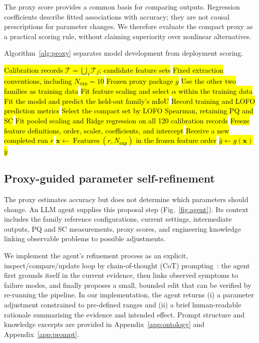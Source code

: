 \documentclass[a4paper,fleqn]{cas-dc}
\begin{document}
{The proxy score provides a common basis for comparing outputs. Regression coefficients describe fitted associations with accuracy; they are not causal prescriptions for parameter changes. We therefore evaluate the compact proxy as a practical scoring rule, without claiming superiority over nonlinear alternatives.

Algorithm~\ref{alg:proxy} separates model development from deployment scoring.

\begin{algorithm}[ht]
\caption{\hl{Proxy calibration and deployment scoring}}
\label{alg:proxy}
\begin{algorithmic}[1]
\Require \hl{Calibration records $\mathcal{T}=\bigcup_f\mathcal{T}_f$; candidate feature sets}
\Require \hl{Fixed extraction conventions, including $N_{\mathrm{exp}}=10$}
\Ensure \hl{Frozen proxy package $g$}
        \State \hl{Use the other two families as training data}
        \State \hl{Fit feature scaling and select $\alpha$ within the training data}
        \State \hl{Fit the model and predict the held-out family's mIoU}
    \EndFor
    \State \hl{Record training and LOFO prediction metrics}
\EndFor
\State \hl{Select the compact set by LOFO Spearman, retaining PQ and SC}
\State \hl{Fit pooled scaling and Ridge regression on all 120 calibration records}
\State \hl{Freeze feature definitions, order, scaler, coefficients, and intercept}
\Statex
\State \hl{Receive a new completed run $r$}
\State \hl{$\mathbf{x}\gets\operatorname{Features}(r,N_{\mathrm{exp}})$ in the frozen feature order}
\State \hl{$\hat{y}\gets g(\mathbf{x})$}
\State \Return \hl{$\hat{y}$}
\end{algorithmic}
\end{algorithm}


\subsection{Proxy-guided parameter self-refinement}
\label{sec:agent-design}

The proxy estimates accuracy but does not determine which parameters should change. An LLM agent supplies this proposal step (Fig.~\ref{fig:agent}). Its context includes the family reference configurations, current settings, intermediate outputs, PQ and SC measurements, proxy scores, and engineering knowledge linking observable problems to possible adjustments.

We implement the agent's refinement process as an explicit, inspect/compare/update loop by chain-of-thought (CoT) prompting~\cite{wei2023cot,yao2023react}: the agent first grounds itself in the current evidence, then links observed symptoms to failure modes, and finally proposes a small, bounded edit that can be verified by re-running the pipeline. In our implementation, the agent returns (i) a parameter adjustment constrained to pre-defined ranges and (ii) a brief human-readable rationale summarising the evidence and intended effect. Prompt structure and knowledge excerpts are provided in Appendix~\ref{app:ontology} and Appendix~\ref{app:prompt}.

}
\end{document}
